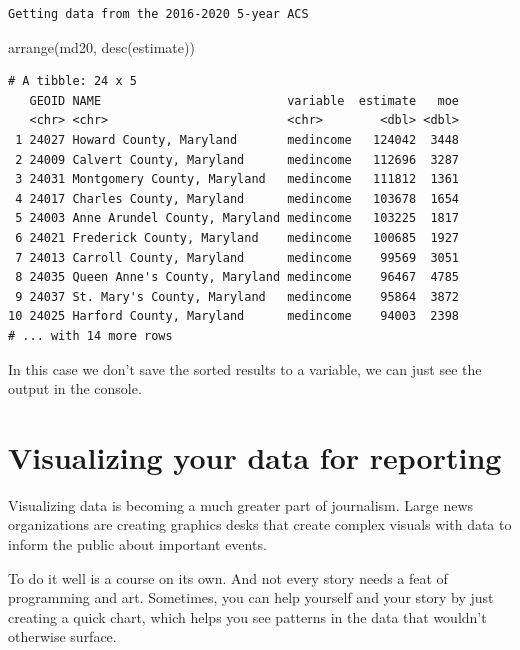 \documentclass[
  letterpaper,
  DIV=11,
  numbers=noendperiod]{scrreprt}
\newenvironment{Shaded}{\begin{snugshade}}{\end{snugshade}}
\newcommand{\FunctionTok}[1]{\textcolor[rgb]{0.28,0.35,0.67}{#1}}
\newcommand{\NormalTok}[1]{\textcolor[rgb]{0.00,0.23,0.31}{#1}}
\begin{document}
\begin{verbatim}
Getting data from the 2016-2020 5-year ACS
\end{verbatim}

\begin{Shaded}
\begin{Highlighting}[]
\FunctionTok{arrange}\NormalTok{(md20, }\FunctionTok{desc}\NormalTok{(estimate))}
\end{Highlighting}
\end{Shaded}

\begin{verbatim}
# A tibble: 24 x 5
   GEOID NAME                          variable  estimate   moe
   <chr> <chr>                         <chr>        <dbl> <dbl>
 1 24027 Howard County, Maryland       medincome   124042  3448
 2 24009 Calvert County, Maryland      medincome   112696  3287
 3 24031 Montgomery County, Maryland   medincome   111812  1361
 4 24017 Charles County, Maryland      medincome   103678  1654
 5 24003 Anne Arundel County, Maryland medincome   103225  1817
 6 24021 Frederick County, Maryland    medincome   100685  1927
 7 24013 Carroll County, Maryland      medincome    99569  3051
 8 24035 Queen Anne's County, Maryland medincome    96467  4785
 9 24037 St. Mary's County, Maryland   medincome    95864  3872
10 24025 Harford County, Maryland      medincome    94003  2398
# ... with 14 more rows
\end{verbatim}

In this case we don't save the sorted results to a variable, we can just
see the output in the console.


\hypertarget{visualizing-your-data-for-reporting}{%
\chapter{Visualizing your data for
reporting}\label{visualizing-your-data-for-reporting}}

Visualizing data is becoming a much greater part of journalism. Large
news organizations are creating graphics desks that create complex
visuals with data to inform the public about important events.

To do it well is a course on its own. And not every story needs a feat
of programming and art. Sometimes, you can help yourself and your story
by just creating a quick chart, which helps you see patterns in the data
that wouldn't otherwise surface.
\end{document}
